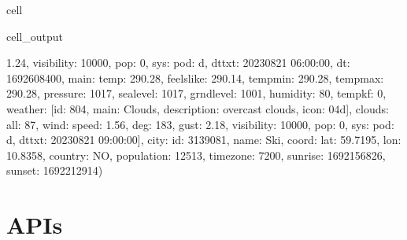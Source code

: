\documentclass[letterpaper,10pt,english]{jupyterBook}
\begin{document}
\begin{sphinxuseclass}{cell}
\begin{sphinxVerbatimOutput}
\begin{sphinxuseclass}{cell_output}
\begin{sphinxVerbatim}[commandchars=\\\{\}]
1.24\PYGZcb{}, \PYGZsq{}visibility\PYGZsq{}: 10000, \PYGZsq{}pop\PYGZsq{}: 0, \PYGZsq{}sys\PYGZsq{}: \PYGZob{}\PYGZsq{}pod\PYGZsq{}: \PYGZsq{}d\PYGZsq{}\PYGZcb{}, \PYGZsq{}dt\PYGZus{}txt\PYGZsq{}: \PYGZsq{}2023\PYGZhy{}08\PYGZhy{}21 06:00:00\PYGZsq{}\PYGZcb{}, \PYGZob{}\PYGZsq{}dt\PYGZsq{}: 1692608400, \PYGZsq{}main\PYGZsq{}: \PYGZob{}\PYGZsq{}temp\PYGZsq{}: 290.28, \PYGZsq{}feels\PYGZus{}like\PYGZsq{}: 290.14, \PYGZsq{}temp\PYGZus{}min\PYGZsq{}: 290.28, \PYGZsq{}temp\PYGZus{}max\PYGZsq{}: 290.28, \PYGZsq{}pressure\PYGZsq{}: 1017, \PYGZsq{}sea\PYGZus{}level\PYGZsq{}: 1017, \PYGZsq{}grnd\PYGZus{}level\PYGZsq{}: 1001, \PYGZsq{}humidity\PYGZsq{}: 80, \PYGZsq{}temp\PYGZus{}kf\PYGZsq{}: 0\PYGZcb{}, \PYGZsq{}weather\PYGZsq{}: [\PYGZob{}\PYGZsq{}id\PYGZsq{}: 804, \PYGZsq{}main\PYGZsq{}: \PYGZsq{}Clouds\PYGZsq{}, \PYGZsq{}description\PYGZsq{}: \PYGZsq{}overcast clouds\PYGZsq{}, \PYGZsq{}icon\PYGZsq{}: \PYGZsq{}04d\PYGZsq{}\PYGZcb{}], \PYGZsq{}clouds\PYGZsq{}: \PYGZob{}\PYGZsq{}all\PYGZsq{}: 87\PYGZcb{}, \PYGZsq{}wind\PYGZsq{}: \PYGZob{}\PYGZsq{}speed\PYGZsq{}: 1.56, \PYGZsq{}deg\PYGZsq{}: 183, \PYGZsq{}gust\PYGZsq{}: 2.18\PYGZcb{}, \PYGZsq{}visibility\PYGZsq{}: 10000, \PYGZsq{}pop\PYGZsq{}: 0, \PYGZsq{}sys\PYGZsq{}: \PYGZob{}\PYGZsq{}pod\PYGZsq{}: \PYGZsq{}d\PYGZsq{}\PYGZcb{}, \PYGZsq{}dt\PYGZus{}txt\PYGZsq{}: \PYGZsq{}2023\PYGZhy{}08\PYGZhy{}21 09:00:00\PYGZsq{}\PYGZcb{}], \PYGZsq{}city\PYGZsq{}: \PYGZob{}\PYGZsq{}id\PYGZsq{}: 3139081, \PYGZsq{}name\PYGZsq{}: \PYGZsq{}Ski\PYGZsq{}, \PYGZsq{}coord\PYGZsq{}: \PYGZob{}\PYGZsq{}lat\PYGZsq{}: 59.7195, \PYGZsq{}lon\PYGZsq{}: 10.8358\PYGZcb{}, \PYGZsq{}country\PYGZsq{}: \PYGZsq{}NO\PYGZsq{}, \PYGZsq{}population\PYGZsq{}: 12513, \PYGZsq{}timezone\PYGZsq{}: 7200, \PYGZsq{}sunrise\PYGZsq{}: 1692156826, \PYGZsq{}sunset\PYGZsq{}: 1692212914\PYGZcb{}\PYGZcb{}\PYGZdq{})
\end{sphinxVerbatim}

\end{sphinxuseclass}\end{sphinxVerbatimOutput}

\end{sphinxuseclass}
\sphinxstepscope


\chapter{APIs}
\label{\detokenize{2_Data_sources/APIs/APIs:apis}}\label{\detokenize{2_Data_sources/APIs/APIs::doc}}
\sphinxstepscope
\end{document}
